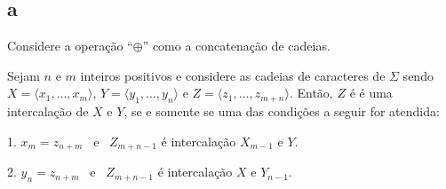 \subsection{a} Considere a operação ``$\oplus$'' como a concatenação de cadeias.

\begin{theorem}
    Sejam $n$ e $m$ inteiros positivos e considere as cadeias de caracteres de $\Sigma$ sendo $X = \langle x_1, \ldots, x_m \rangle$, $Y = \langle y_1, \ldots, y_n \rangle$ e $Z = \langle z_1, \ldots, z_{m + n} \rangle$. Então, $Z$ é é uma intercalação de $X$ e $Y$, se e somente se uma das condições a seguir for atendida:

    1. $x_m = z_{n + m}$ ~e~ $Z_{m + n - 1}$ é intercalação $X_{m - 1}$ e $Y$.

    2. $y_n = z_{n + m}$ ~e~ $Z_{m + n - 1}$ é intercalação $X$ e $Y_{n - 1}$.
\end{theorem}

